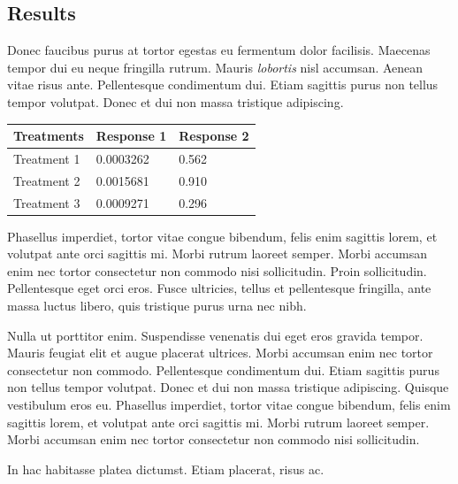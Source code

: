 \documentclass[a0,landscape]{a0poster}
\begin{document}
\begin{multicols}{3}

\section*{Results}

Donec faucibus purus at tortor egestas eu fermentum dolor facilisis. Maecenas tempor dui eu neque fringilla rutrum. Mauris \emph{lobortis} nisl accumsan. Aenean vitae risus ante. Pellentesque condimentum dui. Etiam sagittis purus non tellus tempor volutpat. Donec et dui non massa tristique adipiscing.
%
\begin{table} %
\begin{tabular}{l l l}
\toprule
\textbf{Treatments} & \textbf{Response 1} & \textbf{Response 2}\\
\midrule
Treatment 1 & 0.0003262 & 0.562 \\
Treatment 2 & 0.0015681 & 0.910 \\
Treatment 3 & 0.0009271 & 0.296 \\
\bottomrule
\end{tabular}
\end{table}
%
Phasellus imperdiet, tortor vitae congue bibendum, felis enim sagittis lorem, et volutpat ante orci sagittis mi. Morbi rutrum laoreet semper. Morbi accumsan enim nec tortor consectetur non commodo nisi sollicitudin. Proin sollicitudin. Pellentesque eget orci eros. Fusce ultricies, tellus et pellentesque fringilla, ante massa luctus libero, quis tristique purus urna nec nibh.

Nulla ut porttitor enim. Suspendisse venenatis dui eget eros gravida tempor. Mauris feugiat elit et augue placerat ultrices. Morbi accumsan enim nec tortor consectetur non commodo. Pellentesque condimentum dui. Etiam sagittis purus non tellus tempor volutpat. Donec et dui non massa tristique adipiscing. Quisque vestibulum eros eu. Phasellus imperdiet, tortor vitae congue bibendum, felis enim sagittis lorem, et volutpat ante orci sagittis mi. Morbi rutrum laoreet semper. Morbi accumsan enim nec tortor consectetur non commodo nisi sollicitudin.



In hac habitasse platea dictumst. Etiam placerat, risus ac.


\end{multicols}
\end{document}

